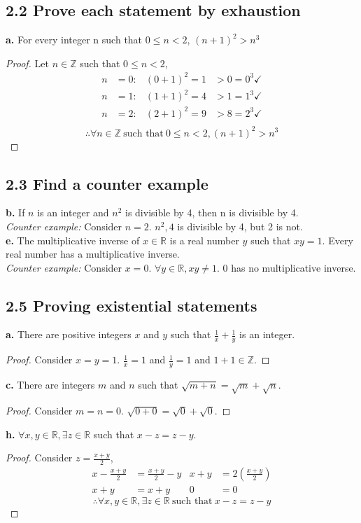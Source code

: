 \documentclass{article}
\begin{document}
\subsection*{2.2 Prove each statement by exhaustion}
\textbf{a.} For every integer n such that $0 \leq n < 2$, $(n+1)^2 > n^3$
\begin{proof}
  Let $n \in \mathbb{Z}$ such that $0 \leq n < 2$,
  \begin{align*}
    n & = 0: & (0+1)^2 = 1 & > 0 = 0^3 \checkmark \\
    n & = 1: & (1+1)^2 = 4 & > 1 = 1^3 \checkmark \\
    n & = 2: & (2+1)^2 = 9 & > 8 = 2^3 \checkmark \\
  \end{align*}
  \[
    \therefore \forall n \in \mathbb{Z}~\text{such that}~0 \leq n < 2, (n+1)^2 > n^3
  \]
\end{proof}

\subsection*{2.3 Find a counter example}
\textbf{b.} If $n$ is an integer and $n^2$ is divisible by 4, then n is divisible by 4. \\
\textit{Counter example:} Consider $n=2$. $n^2,4$ is divisible by 4, but 2 is not. \\
\textbf{e.} The multiplicative inverse of $x \in \mathbb{R}$ is a real number $y$ such that
$xy = 1$. Every real number has a multiplicative inverse. \\
\textit{Counter example:} Consider $x=0$. $\forall y \in \mathbb{R}, xy \not = 1$. 0 has no multiplicative inverse.

\subsection*{2.5 Proving existential statements}
\textbf{a.} There are positive integers $x$ and $y$ such that $\frac{1}{x} + \frac{1}{y}$ is an integer.
\begin{proof}
  Consider $x=y=1$. $\frac{1}{x} = 1$ and $\frac{1}{y} = 1$ and $1+1 \in \mathbb{Z}$.
\end{proof}
\textbf{c.} There are integers $m$ and $n$ such that $\sqrt{m+n} = \sqrt{m} + \sqrt{n}$.
\begin{proof}
  Consider $m=n=0$. $\sqrt{0+0} = \sqrt{0} + \sqrt{0}$.
\end{proof}
\textbf{h.} $\forall x,y \in \mathbb{R}, \exists z \in \mathbb{R}$ such that $x-z=z-y$.
\begin{proof}
  Consider $z=\frac{x+y}{2}$,
  \begin{align*}
    x - \frac{x+y}{2} & = \frac{x+y}{2} - y & x +y & = 2\left(\frac{x+y}{2}\right) \\
    x + y             & = x+y               & 0    & = 0
  \end{align*}
  \[
    \therefore \forall x,y \in \mathbb{R}, \exists z \in \mathbb{R}~\text{such that}~x-z=z-y
  \]
\end{proof}
\end{document}
